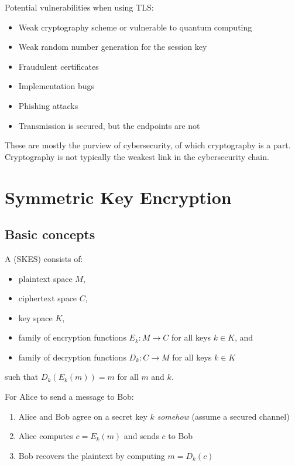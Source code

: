 \documentclass[class=co487,notes]{agony}
\begin{document}
Potential vulnerabilities when using TLS:
\begin{itemize}
  \item Weak cryptography scheme or vulnerable to quantum computing
  \item Weak random number generation for the session key
  \item Fraudulent certificates
  \item Implementation bugs
  \item Phishing attacks
  \item Transmission is secured, but the endpoints are not
\end{itemize}
These are mostly the purview of cybersecurity,
of which cryptography is a part.
Cryptography is not typically the weakest link in the cybersecurity chain.

\chapter{Symmetric Key Encryption}

\section{Basic concepts}

\begin{defn}
  A  (SKES) consists of:
  \begin{itemize}[nosep]
    \item plaintext space $M$,
    \item ciphertext space $C$,
    \item key space $K$,
    \item family of encryption functions $E_k : M \to C$ for all keys $k \in K$, and
    \item family of decryption functions $D_k : C \to M$ for all keys $k \in K$
  \end{itemize}
  such that $D_k(E_k(m)) = m$ for all $m$ and $k$.
\end{defn}

For Alice to send a message to Bob:
\begin{enumerate}[1.,nosep]
  \item Alice and Bob agree on a secret key $k$ \emph{somehow} (assume a secured channel)
  \item Alice computes $c = E_k(m)$ and sends $c$ to Bob
  \item Bob recovers the plaintext by computing $m = D_k(c)$
\end{enumerate}
\end{document}
